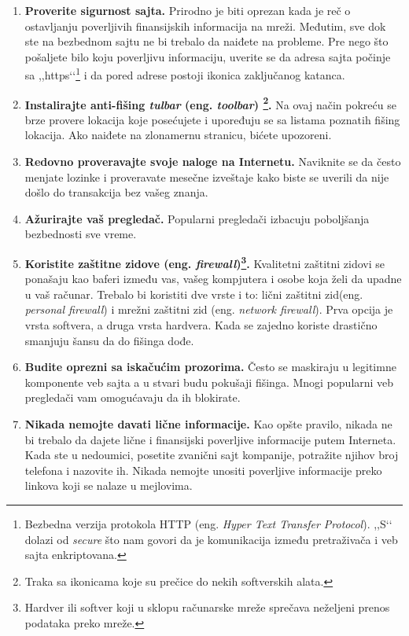 \documentclass[a4paper]{article}
\theoremstyle{break}
\begin{document}
{\begin{enumerate}
\item \textbf{Proverite sigurnost sajta.} Prirodno je biti oprezan kada je reč o ostavljanju poverljivih finansijskih informacija na mreži. Međutim, sve dok ste na bezbednom sajtu ne bi trebalo da naiđete na probleme. Pre nego što pošaljete bilo koju poverljivu informaciju, uverite se da adresa sajta počinje sa ,,https‘‘\footnote{Bezbedna verzija protokola HTTP (eng. {\em Hyper Text Transfer Protocol}). ,,S‘‘ dolazi od \textit{secure} što nam govori da je komunikacija između pretraživača i veb sajta enkriptovana.} i da pored adrese postoji ikonica zaključanog katanca.

\item \textbf{Instalirajte anti-fišing \textit{tulbar} (eng. {\em toolbar}) \footnote{Traka sa ikonicama koje su prečice do nekih softverskih alata.}.} Na ovaj način pokreću se brze provere lokacija koje posećujete i upoređuju se sa listama poznatih fišing lokacija. Ako naiđete na zlonamernu stranicu, bićete upozoreni.

\item \textbf{Redovno proveravajte svoje naloge na Internetu.} Naviknite se da često menjate lozinke i proveravate mesečne izveštaje kako biste se uverili da nije došlo do transakcija bez vašeg znanja.

\item \textbf{Ažurirajte vaš pregledač.} Popularni pregledači izbacuju poboljšanja bezbednosti sve vreme.

\item \textbf{Koristite zaštitne zidove (eng. {\em firewall})\footnote{Hardver ili softver koji u sklopu računarske mreže sprečava neželjeni prenos podataka preko mreže.}.} Kvalitetni zaštitni zidovi se ponašaju kao baferi između vas, vašeg kompjutera i osobe koja želi da upadne u vaš računar. Trebalo bi koristiti dve vrste i to: lični zaštitni zid(eng. {\em personal firewall}) i mrežni zaštitni zid (eng. {\em network firewall}). Prva opcija je vrsta softvera, a druga vrsta hardvera. Kada se zajedno koriste drastično smanjuju šansu da do fišinga dođe.

\item \textbf{Budite oprezni sa iskačućim prozorima.} Često se maskiraju u legitimne komponente veb sajta a u stvari budu pokušaji fišinga. Mnogi popularni veb pregledači vam omogućavaju da ih blokirate.

\item \textbf{Nikada nemojte davati lične informacije.} Kao opšte pravilo, nikada ne bi trebalo da dajete lične i finansijski poverljive informacije putem Interneta. Kada ste u nedoumici, posetite zvanični sajt kompanije, potražite njihov broj telefona i nazovite ih. Nikada nemojte unositi poverljive informacije preko linkova koji se nalaze u mejlovima.


\end{enumerate}}
\end{document}
